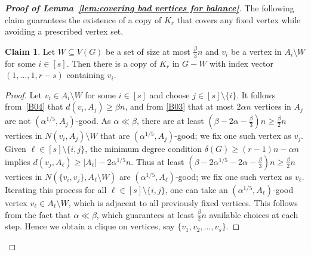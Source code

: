 \documentclass[11pt, a4paper]{article}
\theoremstyle{definition}
\newtheorem{claim}[theorem]{Claim}
\newcommand{\<}{\subseteq}
\begin{document}
\begin{proof}[{\bf Proof of Lemma~\ref{lem:covering bad vertices for balance}}]
The following   claim guarantees the existence of a copy of $K_r$ that covers any fixed vertex while avoiding a prescribed vertex set.   
\begin{claim}\label{covering-v}
   Let $W\subseteq V(G)$ be a set of size at most $\frac{\beta}{3}n$ and $v_i$ be a vertex in $A_i\setminus W$ for some $i\in [s]$. Then there is a copy of $K_r$ in $G-W$ with index vector $(1,\ldots,1,r-s)$ containing $v_i$.  
\end{claim}
\begin{proof}
Let $v_i\in A_i\setminus W$ for some $i\in [s]$ {and choose \( j \in [s] \setminus \{i\} \). It follows from~\ref{B04} that} \( d(v_i, A_j) \geq \beta n \), and from \ref{B03} that at most \( 2\alpha n \) vertices in \( A_j \) are not \( (\alpha^{1/5}, A_j) \)-good. As $\alpha\ll\beta$, there are at least \( (\beta - 2\alpha -\frac{\beta}{3})n\ge \frac{\beta}{2}n \) vertices in \( N(v_i, A_j)\setminus W \) that are \( (\alpha^{1/5}, A_j) \)-good; we  fix one such vertex as \( v_j \). {Given} $\ell\in [s] \setminus \{i, j\}$, the minimum degree condition \( \delta(G) \geq (r-1)n - \alpha n \) implies \( d(v_j, A_\ell) \geq |A_\ell| - 2\alpha^{1/5} n \).
{Thus} at least \( (\beta - 2\alpha^{1/5} - 2\alpha-\frac{\beta}{3})n\ge \frac{\beta}{2}n \) vertices in \( N(\{v_i, v_j\}, A_\ell\setminus W) \) are \( (\alpha^{1/5}, A_\ell) \)-good; we fix one such vertex as \( v_{\ell} \). 
Iterating this process for all \( \ell \in [s] \setminus \{i,j\} \), one can take an \((\alpha^{1/5}, A_\ell) \)-good vertex \( v_{\ell}\in A_\ell\setminus W \), which is adjacent to all previously fixed vertices. This follows {from the fact that \( \alpha \ll \beta \), which guarantees at least \( \frac{\beta}{2}n \) available choices  at each step.}
Hence we obtain a clique on vertices, say $\{v_1,v_2,\ldots,v_s\}$.



\end{proof}
\end{proof}
\end{document}
